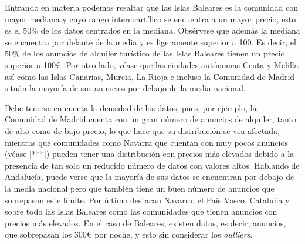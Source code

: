 \documentclass[a4paper,10pt]{article}
\begin{document}
            \noindent
            Entrando en materia podemos resaltar que las Islas Baleares es la comunidad con mayor mediana y cuyo rango intercuartílico se encuentra a un mayor precio, esto es el 50\% de los datos centrados en la mediana. Obsérvese que además la mediana se encuentra por delante de la media y es ligeramente superior a 100. Es decir, el 50\% de los anuncios de alquiler turístico de las Islas Baleares tienen un precio superior a 100€. Por otro lado, véase que las ciudades autónomas Ceuta y Melilla así como las Islas Canarias, Murcia, La Rioja e incluso la Comunidad de Madrid situán la mayoría de sus anuncios por debajo de la media nacional. 
                
            \clearpage

            \noindent
            Debe tenerse en cuenta la densidad de los datos, pues, por ejemplo, la Comunidad de Madrid cuenta con un gran número de anuncios de alquiler, tanto de alto como de bajo precio, lo que hace que su distribución se vea afectada, mientras que comunidades como Navarra que cuentan con muy pocos anuncios (véase [***]) pueden tener una distribución con precios más elevados debido a la presencia de tan solo un reducido número de datos con valores altos.
            Hablando de Andalucía, puede verse que la mayoría de sus datos se encuentran por debajo de la media nacional pero que también tiene un buen
            número de anuncios que sobrepasan este límite. 
            Por último destacan Navarra, el País Vasco, Cataluña y sobre todo las Islas Baleares como las comunidades que tienen anuncios con precios más elevados. En el caso de Baleares, existen datos, es decir, anuncios, que sobrepasan los 300€ por noche, y esto sin considerar los \textit{outliers}. \\
\end{document}
